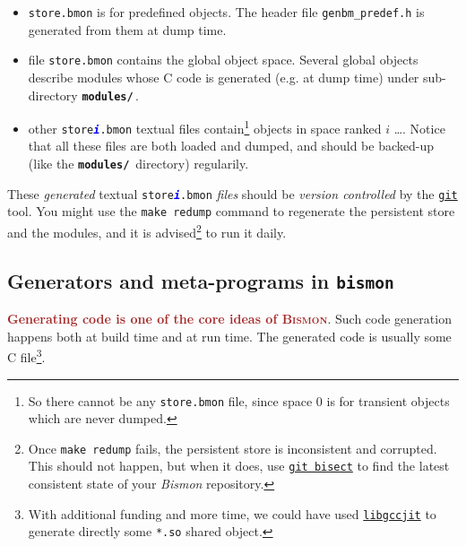 \begin{appendices}
\begin{itemize}
\item \texttt{store.bmon} is for predefined objects. The header file
  \texttt{genbm\_predef.h} is generated from them at dump time.

\item file \texttt{store.bmon} contains the global object space. Several
  global objects describe modules whose C code is generated (e.g. at
  dump time)   under sub-directory
  \textbf{\texttt{modules/}}\,.

\item other \texttt{store\textsection\textcolor{blue}{\textbf{\textit{i}}}.bmon}
  textual files contain\footnote{So there cannot be any
    \texttt{store.bmon} file, since space 0 is for transient objects
    which are never dumped.}  objects in space ranked $i$ \ldots. Notice
  that all these files are both loaded and dumped, and should be
  backed-up (like the \textbf{\texttt{modules/}}\, directory)
  regularily.

\end{itemize}

These \emph{generated} textual
\texttt{store\textsection\textcolor{blue}{\textit{\textbf{i}}}.bmon} \emph{files}
should be \emph{version controlled} by the
\href{https://git-scm.com/}{\texttt{git}} tool. You might use the \texttt{make
  redump} command to regenerate the persistent store and the modules,
and it is advised\footnote{Once \texttt{make redump} fails, the
  persistent store is inconsistent and corrupted. This should not
  happen, but when it does, use
  \href{https://git-scm.com/docs/git-bisect}{\texttt{git bisect}} to
  find the latest consistent state of your \textit{Bismon} repository.}
to run it daily.
  
\subsection{Generators and meta-programs in \texttt{bismon}}

\textcolor{brown}{\textbf{Generating code is one of the core ideas of \textsc{Bismon}}}. Such code
generation happens both at build time and at run time. The generated
code is usually some C file\footnote{With additional funding and more
time, we could have used
\href{https://gcc.gnu.org/onlinedocs/jit/}{\texttt{libgccjit}} to
generate directly some \texttt{*.so} shared object.}.


\end{appendices}
